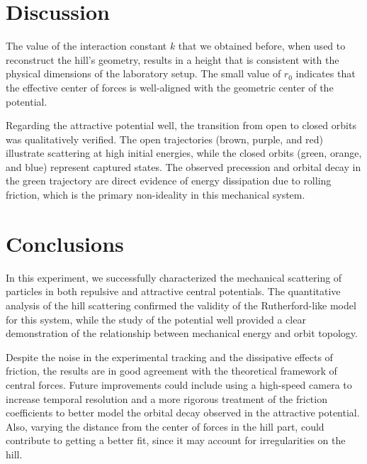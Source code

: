 \documentclass[a4paper,11pt]{article}
\begin{document}
\section{Discussion}
The value of the interaction constant $k$ that we obtained before,  when used to reconstruct the hill's geometry, results in a height that is consistent with the physical dimensions of the laboratory setup. The small value of $r_0$ indicates that the effective center of forces is well-aligned with the geometric center of the potential.

Regarding the attractive potential well, the transition from open to closed orbits was qualitatively verified. The open trajectories (brown, purple, and red) illustrate scattering at high initial energies, while the closed orbits (green, orange, and blue) represent captured states. The observed precession and orbital decay in the green trajectory are direct evidence of energy dissipation due to rolling friction, which is the primary non-ideality in this mechanical system.

\section{Conclusions}


In this experiment, we successfully characterized the mechanical scattering of particles in both repulsive and attractive central potentials. The quantitative analysis of the hill scattering confirmed the validity of the Rutherford-like model for this system,
 while the study of the potential well provided a clear demonstration of the relationship between mechanical energy and orbit topology.

Despite the noise in the experimental tracking and the dissipative effects of friction, the results are in good agreement with the theoretical framework of central forces.
 Future improvements could include using a high-speed camera to increase temporal resolution and a more rigorous treatment of the friction coefficients to better model the orbital decay observed in the attractive potential.
 Also, varying the distance from the center of forces in the hill part, could contribute to getting a better fit, since it may account for irregularities on the hill.
\end{document}
